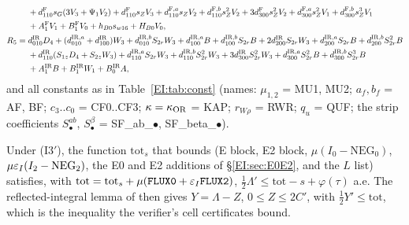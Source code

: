 \documentclass[11pt]{article}
\begin{document}
\begin{lemma}
\begin{align*}
&+d^{\rm F}_{110}s_G(3V_3+\Psi_1V_2)+d^{\rm F}_{110}s_ZV_3+d^{{\rm F},a}_{110}s_ZV_2+d^{{\rm F},b}_{110}s_Z^2V_2+3d^{\rm F}_{300}s_Z^2V_2+d^{{\rm F},a}_{300}s_Z^2V_1+d^{{\rm F},b}_{300}s_Z^3V_1\\
&+A_1^{\rm F}V_1+B_1^{\rm F}V_0+h_{B0}s_{w16}+H_{B0}V_0,\\
R_5={}&d^{\rm IR}_{010}D_4+(d^{{\rm IR},a}_{010}+d^{\rm IR}_{100})W_3+d^{{\rm IR},b}_{010}S_{2r}W_3+d^{{\rm IR},a}_{100}B+d^{{\rm IR},b}_{100}S_{2r}B+2d^{\rm IR}_{200}S_{2r}W_3+d^{{\rm IR},a}_{200}S_{2r}B+d^{{\rm IR},b}_{200}S_{2r}^2B\\
&+d^{\rm IR}_{110}(S_{1z}D_4+S_{2z}W_3)+d^{{\rm IR},a}_{110}S_{2r}W_3+d^{{\rm IR},b}_{110}S_{2r}^2W_3+3d^{\rm IR}_{300}S_{2r}^2W_3+d^{{\rm IR},a}_{300}S_{2r}^2B+d^{{\rm IR},b}_{300}S_{2r}^3B\\
&+A_1^{\rm IR}B+B_1^{\rm IR}W_1+B_0^{\rm IR}A,
\end{align*}
and all constants as in Table~\ref{EI:tab:const} (names: $\mu_{1,2}$ = MU1, MU2; $a_f,b_f$ = AF, BF; $c_3..c_0$ = CF0..CF3; $\kappa=\kappa_{\mathrm{OR}}$ = KAP; $r_{W\rho}$ = RWR; $q_u$ = QUF; the strip coefficients $S^{ab}_\bullet$, $S^\beta_\bullet$ = SF\_ab\_$\bullet$, SF\_beta\_$\bullet$).
\end{lemma}

\begin{corollary}\label{EI:cor}
Under (I3$'$), the function $\mathrm{tot}_s$ that  bounds (E block, E2 block, $\mu(I_0-\mathrm{NEG}_0)$, $\mu\varepsilon_I(I_2-\mathrm{NEG}_2)$, the E0 and E2 additions of \S\ref{EI:sec:E0E2}, and the $L$ list) satisfies, with $\mathrm{tot}=\mathrm{tot}_s+\mu(\fn{FLUX0}+\eI\fn{FLUX2})$, $\frac12\Lambda'\le\mathrm{tot}-s+\varphi(\tau)$ a.e. The reflected-integral lemma of  then gives $Y=\Lambda-Z$, $0\le Z\le2C'$, with $\frac12Y'\le\mathrm{tot}$, which is the inequality the verifier's cell certificates bound.
\end{corollary}
\end{document}
